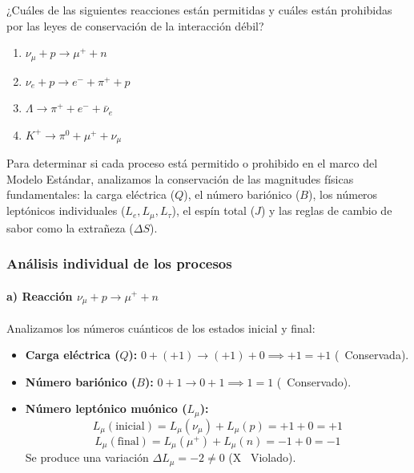 \newpage
\begin{problema}
¿Cuáles de las siguientes reacciones están permitidas y cuáles están prohibidas por las leyes de conservación de la interacción débil?
\begin{enumerate}[label=\alph*)]
    \item $\nu_\mu + p \to \mu^+ + n$
    \item $\nu_e + p \to e^- + \pi^+ + p$
    \item $\Lambda \to \pi^+ + e^- + \bar{\nu}_e$
    \item $K^+ \to \pi^0 + \mu^+ + \nu_\mu$
\end{enumerate}

\tcblower

Para determinar si cada proceso está permitido o prohibido en el marco del Modelo Estándar, analizamos la conservación de las magnitudes físicas fundamentales: la carga eléctrica ($Q$), el número bariónico ($B$), los números leptónicos individuales ($L_e, L_\mu, L_\tau$), el espín total ($J$) y las reglas de cambio de sabor como la extrañeza ($\Delta S$).

\subsubsection*{Análisis individual de los procesos}

\paragraph{a) Reacción $\nu_\mu + p \to \mu^+ + n$}
Analizamos los números cuánticos de los estados inicial y final:
\begin{itemize}
    \item \textbf{Carga eléctrica ($Q$):} $0 + (+1) \to (+1) + 0 \implies +1 = +1$ \quad (\checkmark \, Conservada).
    \item \textbf{Número bariónico ($B$):} $0 + 1 \to 0 + 1 \implies 1 = 1$ \quad (\checkmark \, Conservado).
    \item \textbf{Número leptónico muónico ($L_\mu$):}
    \begin{equation*}
        L_\mu(\text{inicial}) = L_\mu(\nu_\mu) + L_\mu(p) = +1 + 0 = +1
    \end{equation*}
    \begin{equation*}
        L_\mu(\text{final}) = L_\mu(\mu^+) + L_\mu(n) = -1 + 0 = -1
    \end{equation*}
    Se produce una variación $\Delta L_\mu = -2 \neq 0$ \quad (\textsf{X} \, Violado).
\end{itemize}


\end{problema}
